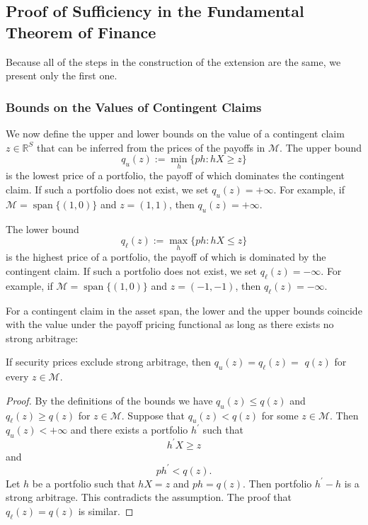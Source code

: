 \documentclass[\topdir/lecture\_notes.tex]{subfiles}
\begin{document}
\begin{optional}
\subsection{Proof of Sufficiency in the Fundamental Theorem of Finance}
Because all of the steps in the construction of the extension are the same, we present only the first one.
\subsubsection*{Bounds on the Values of Contingent Claims}
We now define the upper and lower bounds on the value of a contingent claim \(z \in \mathbb{R}^{S}\) that can be inferred from the prices of the payoffs in \(\mathcal{M}\). The upper bound
\begin{equation}
q_{u}(z) := \min _{h}\{p h: h X \geq z\} \label{4.3}
\end{equation}
is the lowest price of a portfolio, the payoff of which dominates the contingent claim. If such a portfolio does not exist, we set \(q_{u}(z)=+\infty\). For example, if \(\mathcal{M}=\operatorname{span}\{(1,0)\}\) and \(z=(1,1)\), then \(q_{u}(z)=+\infty\).

The lower bound
\begin{equation}
q_{\ell}(z) := \max _{h}\{p h: h X \leq z\} \label{4.4}
\end{equation}
is the highest price of a portfolio, the payoff of which is dominated by the contingent claim. If such a portfolio does not exist, we set \(q_{\ell}(z)=-\infty\). For example, if \(\mathcal{M}=\operatorname{span}\{(1,0)\}\) and \(z=(-1,-1)\), then \(q_{\ell}(z)=-\infty\).

For a contingent claim in the asset span, the lower and the upper bounds coincide with the value under the payoff pricing functional as long as there exists no strong arbitrage:

\begin{proposition} \label{prop:bounds_equal_pricing}
If security prices exclude strong arbitrage, then \(q_{u}(z)=q_{\ell}(z)=\) \(q(z)\) for every \(z \in \mathcal{M}\).
\end{proposition}
\begin{proof}
By the definitions of the bounds we have \(q_{u}(z) \leq q(z)\) and \(q_{\ell}(z) \geq q(z)\) for \(z \in \mathcal{M}\). Suppose that \(q_{u}(z)<q(z)\) for some \(z \in \mathcal{M}\). Then \(q_{u}(z)<+\infty\) and there exists a portfolio \(h^{\prime}\) such that
\begin{equation*}
h^{\prime} X \geq z 
\end{equation*}
and
\begin{equation*}
p h^{\prime}<q(z) . 
\end{equation*}
Let \(h\) be a portfolio such that \(h X=z\) and \(p h=q(z)\). Then portfolio \(h^{\prime}-h\) is a strong arbitrage. This contradicts the assumption. The proof that \(q_{\ell}(z)=q(z)\) is similar.
\end{proof}


\end{optional}
\end{document}
